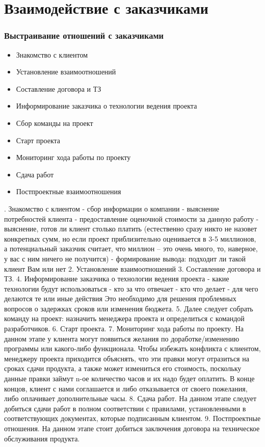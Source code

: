 \documentclass{../industrial-development}
\begin{document}
\section{Взаимодействие с заказчиками}

\begin{frame} \frametitle{Выстраивание отношений с заказчиками}

\begin{itemize}
 \item Знакомство с клиентом
 \item Установление взаимоотношений
 \item Составление договора и ТЗ
 \item Информирование заказчика о технологии ведения проекта
 \item Сбор команды на проект 
 \item Старт проекта 
 \item Мониторинг хода работы по проекту
 \item Сдача работ
 \item Постпроектные взаимоотношения
  \end{itemize}
\end{frame}

. Знакомство с клиентом
  - сбор информации о компании
  -  выяснение потребностей клиента
  - предоставление оценочной стоимости за данную работу
 -  выяснение, готов ли клиент столько платить (естественно сразу никто не назовет конкретных сумм, но если проект приблизительно оценивается в 3-5 миллионов, а потенциальный заказчик считает, что миллион –  это очень много, то, наверное, у вас с ним ничего не получится)
  - формирование вывода: подходит ли такой клиент Вам или нет
2. Установление взаимоотношений
3. Составление договора и ТЗ.
4. Информирование заказчика о технологии ведения проекта
 - какие технологии будут использоваться
 - кто за что отвечает
 - кто что делает
 - для чего делаются те или иные действия
 Это необходимо для решения проблемных вопросов о задержках сроков или изменения бюджета.
5. Далее следует собрать команду на проект: назначить менеджера проекта и определиться с командой разработчиков.
6. Старт проекта.
7. Мониторинг хода работы по проекту. 
На данном этапе у клиента могут появиться желания по доработке/изменению программы или какого-либо функционала. Чтобы избежать конфликта с клиентом, менеджеру проекта приходится объяснять, что эти правки могут отразиться на сроках сдачи продукта, а также может измениться его стоимость, поскольку данные правки займут n-ое количество часов и их надо будет оплатить. В конце концов, клиент с нами соглашается и либо отказывается от своего пожелания, либо оплачивает дополнительные часы. 
8. Сдача работ.
На данном этапе следует добиться сдачи работ в полном соответствии с правилами, установленными в соответствующих документах, которые подписанным клиентом.
9. Постпроектные отношения. 
На данном этапе стоит добиться заключения договора на техническое обслуживания продукта.
\end{document}
